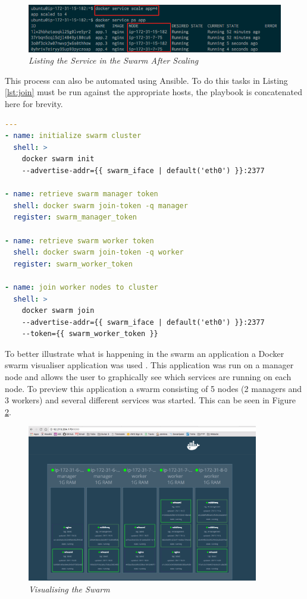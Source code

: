 \documentclass{article}
\begin{document}
\begin{figure}[!h]
\centering
\includegraphics*[width=\textwidth]{components/images/swarm_after_scale}
\caption{\em Listing the Service in the Swarm After Scaling}
\label{fig:swarm_after_scale}
\end{figure}

This process can also be automated using Ansible. To do this tasks in Listing \ref{lst:join} must be run against the appropriate hosts, the playbook is concatenated here for brevity.

\newpage
\begin{lstlisting}[float,floatplacement=!h,language=yaml,caption={create-and-join-swarm.yml},label={lst:join},basicstyle=\scriptsize]
  ---
- name: initialize swarm cluster
  shell: >
    docker swarm init
    --advertise-addr={{ swarm_iface | default('eth0') }}:2377

- name: retrieve swarm manager token
  shell: docker swarm join-token -q manager
  register: swarm_manager_token

- name: retrieve swarm worker token
  shell: docker swarm join-token -q worker
  register: swarm_worker_token
  
- name: join worker nodes to cluster
  shell: >
    docker swarm join
    --advertise-addr={{ swarm_iface | default('eth0') }}:2377
    --token={{ swarm_worker_token }}
\end{lstlisting}

To better illustrate what is happening in the swarm an application a Docker swarm visualiser application was used \citep{Marks2016}. This application was run on a manager node and allows the user to graphically see which services are running on each node. To preview this application a swarm consisting of 5 nodes (2 managers and 3 workers) and several different services was started. This can be seen in Figure \ref{fig:visualiser}.

\begin{figure}[!h]
\centering
\includegraphics*[width=0.9\textwidth]{components/images/visualiser}
\caption{\em Visualising the Swarm}
\label{fig:visualiser}
\end{figure}
\end{document}
